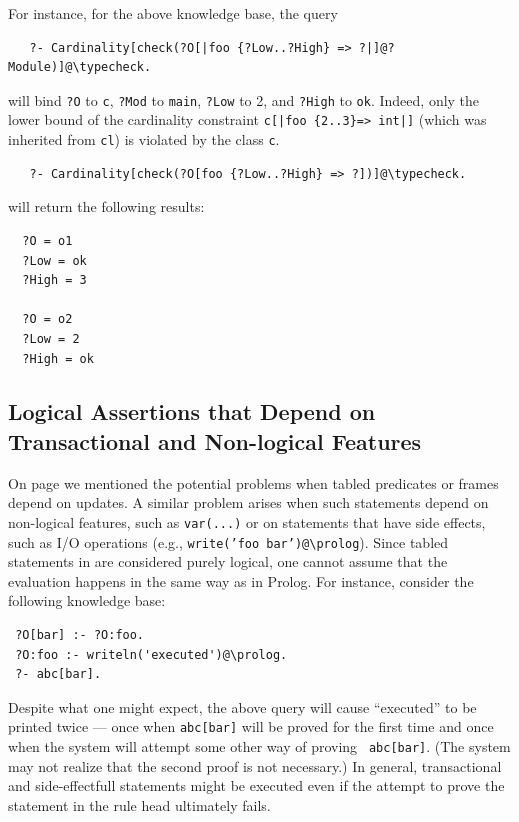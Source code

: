 \documentclass[11pt]{article}
\newcommand{\ERGO}{\mbox{\smaller{\ensuremath{\cal{E}}\smaller{{\sc{RGO}}}}}\xspace}
\newcommand{\FLSYSTEM}{\ERGO}
\newcommand{\bs}{\textbackslash}
\begin{document}
\begin{itemize}
  For instance, for the above knowledge base, the query
\begin{verbatim}
   ?- Cardinality[check(?O[|foo {?Low..?High} => ?|]@?Module)]@\typecheck.  
\end{verbatim}
  will bind {\tt ?O} to {\tt c}, {\tt ?Mod} to {\tt main}, {\tt ?Low} to 2,
  and {\tt ?High} to {\tt ok}. Indeed, only the lower bound of the
  cardinality constraint {\tt c[|foo \{2..3\}=> int|]} (which was inherited from
  {\tt cl}) is violated by the class {\tt c}.
\begin{verbatim}
   ?- Cardinality[check(?O[foo {?Low..?High} => ?])]@\typecheck.
\end{verbatim}
  will return the following results:
\begin{verbatim}
  ?O = o1
  ?Low = ok
  ?High = 3

  ?O = o2
  ?Low = 2
  ?High = ok
\end{verbatim}

\end{itemize}



\subsection{Logical Assertions that Depend on Transactional and Non-logical Features}

On page \pageref{page-depchk} we mentioned the potential problems when
tabled predicates or frames depend on updates. A similar problem
arises when such statements depend on non-logical features, such as
{\tt var(...)} or on statements that have side effects, such as I/O
operations (e.g., {\tt write('foo bar')@\bs{}prolog}). Since tabled statements
in \FLSYSTEM are considered purely logical, one cannot assume that the
evaluation happens in the same way as in Prolog.
For instance, consider the following knowledge base:
\begin{verbatim}
 ?O[bar] :- ?O:foo.
 ?O:foo :- writeln('executed')@\prolog.  
 ?- abc[bar].
\end{verbatim}
Despite what one might expect, the above query will cause ``executed'' to
be printed twice --- once when {\tt abc[bar]} will be proved for the first
time and once when the system will attempt some other way of proving {\tt
  abc[bar]}. (The system may not realize that the second proof is not
necessary.) In general, transactional and side-effectfull statements 
might be executed even if the attempt to prove the statement in the rule
head ultimately fails.
\end{document}
